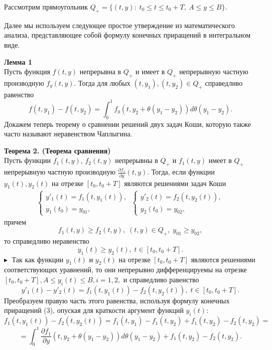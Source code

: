 Рассмотрим прямоугольник
$
Q_+=\{(t,y):\; t_0\leq t\leq t_0+T,\: A\leq y\leq B\}.
$

Далее мы используем следующее простое утверждение из математического анализа, представляющее собой формулу конечных приращений в интегральном виде.

\textbf{Лемма 1}\\
Пусть функция $f(t,y)$ непрерывна в $Q_+$ и имеет в $Q_+$ непрерывную частную производную $f_y(t,y)$. Тогда для любых $(t,y_1), (t,y_2)\in Q_+$ справедливо равенство
\begin{equation*}\tag{3}
f(t,y_1)-f(t,y_2)=\int_0^1 f_y(t,y_2+\theta(y_1-y_2))d\theta(y_1-y_2).
\end{equation*}
Докажем теперь теорему о сравнении решений двух задач Коши, которую также часто называют  неравенством Чаплыгина.

\textbf{Теорема 2. (Теорема сравнения)}\\
Пусть функции $f_1(t,y)$, $f_2(t,y)$ непрерывны в $Q_+$ и $f_1(t,y)$ имеет в $Q_+$ непрерывную частную производную $\frac{\partial f_1}{\partial y}(t,y)$. Тогда, если функции $y_1(t), y_2(t)$ на отрезке $[t_0,t_0+T]$ являются решениями задач Коши
\begin{equation*}
\begin{split}
\begin{cases}
y'_1(t)=f_1(t,y_1(t)),\\
y_1(t_0)=y_{01},
\end{cases}
\:
\begin{cases}
y'_2(t)=f_2(t,y_2(t)),\\
y_2(t_0)=y_{02},
\end{cases}
\end{split}
\end{equation*}
причем
\begin{equation*}
f_1(t,y)\geq f_2(t,y), \;(t,y)\in Q_+, \;y_{01}\geq y_{02},
\end{equation*}
то справедливо неравенство
\begin{equation*}
y_1(t)\geq y_2(t),\; t\in [t_0,t_0+T].
\end{equation*}
$\blacktriangleright\;$ Так как функции $y_1(t)$ и $y_2(t)$ на отрезке $[t_0,t_0+T]$ являются решениями соответствующих уравнений, то они непрерывно дифференцируемы на отрезке $[t_0,t_0+T], A \leq y_i(t) \leq B, i=1,2,$ и справедливо равенство
\begin{equation*}\tag{4}
y'_1(t)-y'_2(t)=f_1(t,y_1(t))-f_2(t,y_2(t)), \;t\in[t_0,t_0+T].
\end{equation*}
Преобразуем правую часть этого равенства, используя формулу конечных приращений (3), опуская для краткости аргумент функций $y_i(t)$:
\begin{equation*}
f_1(t,y_1(t))-f_2(t,y_2(t))= 
f_1(t,y_1)-f_1(t,y_2)+f_1(t,y_2)-f_2(t,y_2)=
\end{equation*}
$$=\int_0^1 \frac{\partial f_1}{\partial y}(t,y_2+\theta(y_1-y_2))d\theta(y_1-y_2)+f_1(t,y_2)-f_2(t,y_2).$$

